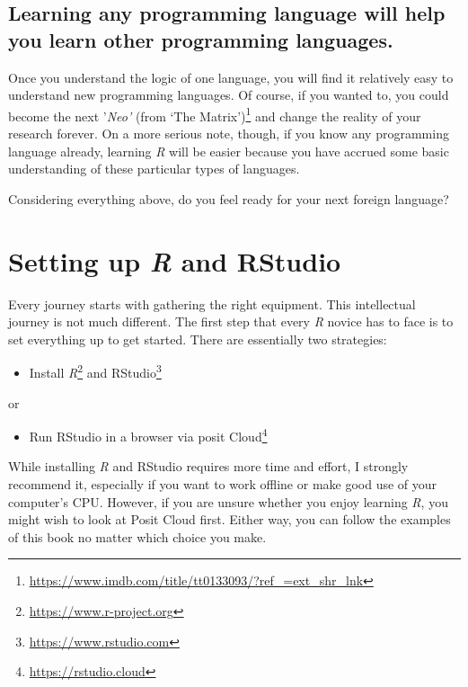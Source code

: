 \documentclass[
  letterpaper,
]{krantz}
\providecommand{\tightlist}{%
  \setlength{\itemsep}{0pt}\setlength{\parskip}{0pt}}\usepackage{longtable,booktabs,array}
\renewcommand{\href}[2]{#2\footnote{\url{#1}}}
\begin{document}
\section{Learning any programming language will help you learn other
programming
languages.}\label{sec-learning-any-programming-language-will-help-you-learn-other-programming-languages.}

Once you understand the logic of one language, you will find it
relatively easy to understand new programming languages. Of course, if
you wanted to, you could become the next '\emph{Neo'} (from
\href{https://www.imdb.com/title/tt0133093/?ref_=ext_shr_lnk}{`The
Matrix')} and change the reality of your research forever. On a more
serious note, though, if you know any programming language already,
learning \emph{R} will be easier because you have accrued some basic
understanding of these particular types of languages.

Considering everything above, do you feel ready for your next foreign
language?


\chapter{\texorpdfstring{Setting up \emph{R} and
RStudio}{Setting up R and RStudio}}\label{sec-setting-up-r-and-rstudio}

Every journey starts with gathering the right equipment. This
intellectual journey is not much different. The first step that every
\emph{R} novice has to face is to set everything up to get started.
There are essentially two strategies:

\begin{itemize}
\tightlist
\item
  Install \href{https://www.r-project.org}{\emph{R}} and
  \href{https://www.rstudio.com}{RStudio}
\end{itemize}

or

\begin{itemize}
\tightlist
\item
  Run RStudio in a browser via \href{https://rstudio.cloud}{posit Cloud}
\end{itemize}

While installing \emph{R} and RStudio requires more time and effort, I
strongly recommend it, especially if you want to work offline or make
good use of your computer's CPU. However, if you are unsure whether you
enjoy learning \emph{R}, you might wish to look at Posit Cloud first.
Either way, you can follow the examples of this book no matter which
choice you make.
\end{document}
